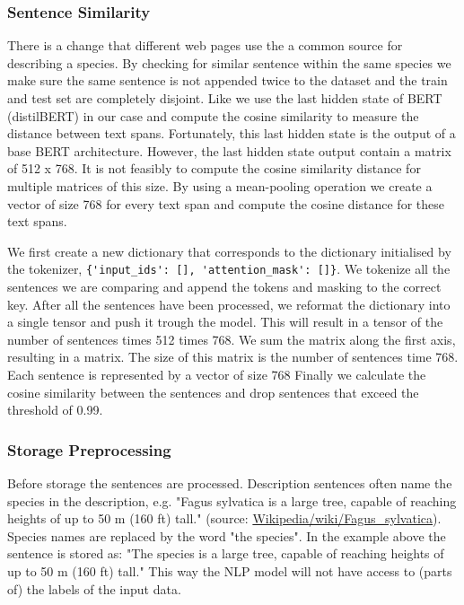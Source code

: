 \documentclass[a4paper, 12pt, oneside]{book} %
\begin{document}
\subsubsection{Sentence Similarity} \label{Sentence Similarity}
There is a change that different web pages use the a common source for describing a species.
By checking for similar sentence within the same species we make sure the same sentence is not appended twice to the dataset and the train and test set are completely disjoint.
Like \textcite{reimers_sentence-bert_2019} we use the last hidden state of BERT (distilBERT) in our case and compute the cosine similarity to measure the distance between text spans.
Fortunately, this last hidden state is the output of a base BERT architecture.
However, the last hidden state output contain a matrix of 512 x 768. 
It is not feasibly to compute the cosine similarity distance for multiple matrices of this size.
By using a mean-pooling operation we create a vector of size 768 for every text span and compute the cosine distance for these text spans.

We first create a new dictionary that corresponds to the dictionary initialised by the tokenizer, \verb|{'input_ids': [], 'attention_mask': []}|.
We tokenize all the sentences we are comparing and append the tokens and masking to the correct key.
After all the sentences have been processed, we reformat the dictionary into a single tensor and push it trough the model.
This will result in a tensor of the number of sentences times 512 times 768. 
We sum the matrix along the first axis, resulting in a matrix.
The size of this matrix is the number of sentences time 768.
Each sentence is represented by a vector of size 768
Finally we calculate the cosine similarity between the sentences and drop sentences that exceed the threshold of 0.99.

\subsubsection{Storage Preprocessing}
Before storage the sentences are processed.
Description sentences often name the species in the description, e.g. "Fagus sylvatica is a large tree, capable of reaching heights of up to 50 m (160 ft) tall." (source: \href{https://en.wikipedia.org/wiki/Fagus_sylvatica}{Wikipedia/wiki/Fagus\_sylvatica}).
Species names are replaced by the word "the species". 
In the example above the sentence is stored as: "The species is a large tree, capable of reaching heights of up to 50 m (160 ft) tall."
This way the NLP model will not have access to (parts of) the labels of the input data.
\end{document}
